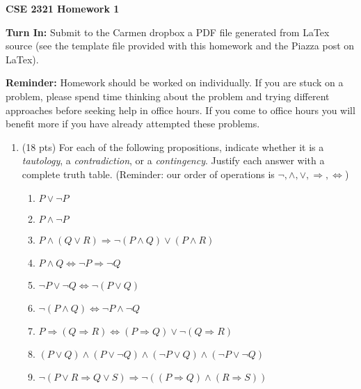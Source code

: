 \documentclass[14pt]{extarticle}
\begin{document}
\textbf{CSE 2321 Homework 1}

\textbf{Turn In:} Submit to the Carmen dropbox a PDF file generated from LaTex source (see the template file provided with this homework and the Piazza post on LaTex).

\textbf{Reminder:} Homework should be worked on individually. If you are stuck on a problem, please spend time thinking about the problem and trying different approaches before seeking help in office hours. If you come to office hours you will benefit more if you have already attempted these problems. 

\begin{enumerate}
\item (18 pts) For each of the following propositions, indicate whether it is a \textit{tautology}, a \textit{contradiction}, or a \textit{contingency}. Justify each answer with a complete truth table. (Reminder: our order of operations is $\neg, \land, \lor, \Rightarrow, \Leftrightarrow$)
\begin{enumerate}
\item $P \lor \neg P$
\item $P \land \neg P$
\item $P \land (Q \lor R) \Rightarrow \neg (P \land Q) \lor (P \land R)$
\item $P \land Q \Leftrightarrow \neg P \Rightarrow \neg Q$
\item $\neg P \lor \neg Q \Leftrightarrow \neg (P \lor Q)$
\item $\neg (P \land Q) \Leftrightarrow \neg P \land \neg Q$
\item $P \Rightarrow (Q \Rightarrow R) \Leftrightarrow (P \Rightarrow Q) \lor \neg (Q \Rightarrow R)$
\item $(P \lor Q) \land (P \lor \neg Q) \land (\neg P \lor Q) \land (\neg P \lor \neg Q)$
\item $\neg (P \lor R \Rightarrow Q \lor S) \Rightarrow \neg ((P \Rightarrow Q) \land (R \Rightarrow S))$
\end{enumerate}


\end{enumerate}
\end{document}
